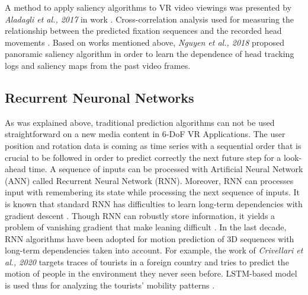 A method to apply saliency algorithms to VR video viewings was presented by \textit{Aladagli et al., 2017} in work \cite{predicting_360}. Cross-correlation analysis used for measuring the relationship between the predicted fixation sequences and the recorded head movements \cite{predicting_360}. Based on works mentioned above, \textit{Nguyen et al., 2018} proposed panoramic saliency algorithm in order to learn the dependence of head tracking logs and saliency maps from the past video frames.\\

\subsection{Recurrent Neuronal Networks}
\label{sec:related:deep}
As was explained above, traditional prediction algorithms can not be used straightforward on a new media content in 6-DoF VR Applications. The user position and rotation data is coming as time series with a sequential order that is crucial to be followed in order to predict correctly the next future step for a look-ahead time. A sequence of inputs can be processed with Artificial Neural Network (ANN) called Recurrent Neural Network (RNN). Moreover, RNN can processes input with remembering its state while processing the next sequence of inputs. It is known that standard RNN has difficulties to learn long-term dependencies with gradient descent \cite{rnn_difficults}. Though RNN can robustly store information, it yields a problem of vanishing gradient that make leaning difficult \cite{rnn_difficults}. In the last decade, RNN algorithms have been adopted for motion prediction of 3D sequences with long-term dependencies taken into account. For example, the work of \textit{Crivellari et al., 2020} targets traces of tourists in a foreign country and tries to predict the motion of people in the environment they never seen before. LSTM-based model is used thus for analyzing the tourists’ mobility patterns \cite{tourist_traces}.\\
